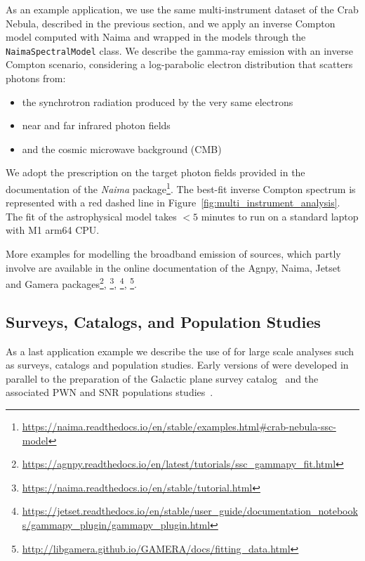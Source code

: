 \documentclass[longauth]{aa}
\newcommand{\code}[1]{\texttt{#1}}
\begin{document}
As an example application, we use the same multi-instrument
dataset of the Crab Nebula, described in the previous section,
and we apply an inverse
Compton model computed with Naima and wrapped in the \gammapy models
through the \code{NaimaSpectralModel} class. We describe the gamma-ray emission 
with an inverse Compton scenario, considering a log-parabolic
electron distribution that scatters photons from:
%
\begin{itemize}
	\item the synchrotron radiation produced by
	the very same electrons
	\item near and far infrared photon fields
	\item and the cosmic microwave background (CMB)
\end{itemize}
%
We adopt the prescription on the target photon fields provided in the documentation of the \textit{Naima}
package\footnote{\url{https://naima.readthedocs.io/en/stable/examples.html\#crab-nebula-ssc-model}}.
The best-fit inverse Compton spectrum is represented with a red dashed line in
Figure~\ref{fig:multi_instrument_analysis}. The fit of the astrophysical model
takes $<5$ minutes to run on a standard laptop with M1 arm64 CPU.

More examples for modelling the broadband emission of \gammaray sources, which 
partly involve \gammapy are available in the online documentation of the
Agnpy, Naima, Jetset and Gamera packages\footnote{\url{https://agnpy.readthedocs.io/en/latest/tutorials/ssc\_gammapy\_fit.html}},
\footnote{\url{https://naima.readthedocs.io/en/stable/tutorial.html}}, 
\footnote{\url{https://jetset.readthedocs.io/en/stable/user\_guide/documentation\_notebooks/gammapy\_plugin/gammapy\_plugin.html}},
\footnote{\url{http://libgamera.github.io/GAMERA/docs/fitting\_data.html}}.



\subsection{Surveys, Catalogs, and Population Studies}
\label{ssec:surveys-catalogs-and-population-studies}
As a last application example we describe the use of \gammapy for large scale
analyses such as \gammaray surveys, catalogs and population studies.
Early versions of \gammapy were developed in parallel to the preparation of
the \hess Galactic plane survey catalog~\citep[HGPS, ][]{2018A&A...612A...1H} and
the associated PWN and SNR populations studies~\citep{2018A&A...612A...2H,2018A&A...612A...3H}. 
\end{document}
